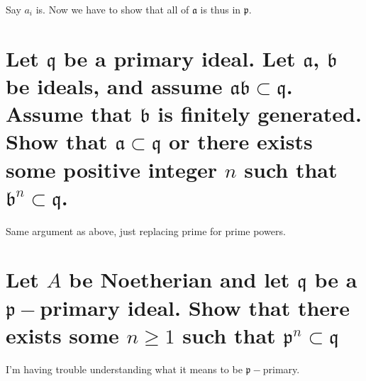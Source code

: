 \documentclass{article}
\begin{document}
Say $a_i$ is. Now we have to show that all of $\mathfrak{a}$ is thus in $\mathfrak{p}$.

\section{Let $\mathfrak{q}$ be a primary ideal. Let $\mathfrak{a}$, $\mathfrak{b}$ be ideals, and assume $\mathfrak{ab} \subset \mathfrak{q}$. Assume that $\mathfrak{b}$ is finitely generated. Show that $\mathfrak{a} \subset  \mathfrak{q}$ or there exists some positive integer $n$ such that $\mathfrak{b}^n \subset \mathfrak{q}$.}

Same argument as above, just replacing prime for prime powers.

\section{Let $A$ be Noetherian and let $\mathfrak{q}$ be a $\mathfrak{p}-$primary ideal. Show that there exists some $n \ge 1$ such that $\mathfrak{p}^n \subset \mathfrak{q}$}

I'm having trouble understanding what it means to be $\mathfrak{p}-$primary.
\end{document}
